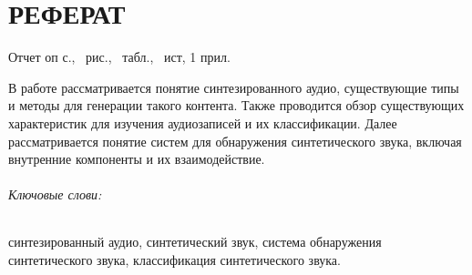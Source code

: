 \part*{РЕФЕРАТ}

Отчет оп \pageref{LastPage} с., \totalfigures\ рис., \totaltables\ табл., \thetotalbibentries\ ист, 1 прил.

В работе рассматривается понятие синтезированного аудио, существующие типы и методы для генерации такого контента. Также проводится обзор существующих характеристик для изучения аудиозаписей и их классификации. Далее рассматривается понятие систем для обнаружения синтетического звука, включая внутренние компоненты и их взаимодействие.

\paragraph*{Ключовые слови:} синтезированный аудио, синтетический звук, система обнаружения синтетического звука, классификация синтетического звука.